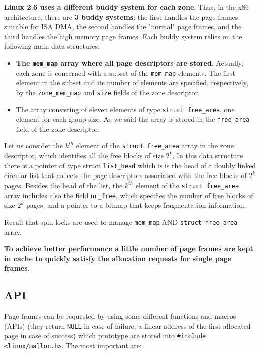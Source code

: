 \documentclass[10pt,a4paper]{article}
\begin{document}
\textbf{Linux 2.6 uses a different buddy system for each zone}. Thus, in the x86 architecture, there are \textbf{3 buddy systems}: the first handles the page frames suitable for ISA DMA, the second handles the "normal" page frames, and the third handles the high memory page frames. Each buddy system relies on the following main data structures:
\begin{itemize}
\item \textbf{The \texttt{mem\_map} array where all page descriptors are stored}. Actually, each zone is concerned with a subset of the \texttt{mem\_map} elements. The first element in the subset and its number of elements are specified, respectively, by the \texttt{zone\_mem\_map} and \texttt{size} fields of the zone descriptor.

\item The array consisting of eleven elements of type \texttt{struct free\_area}, one element for each group size. As we said the array is stored in the \texttt{free\_area} field of the zone descriptor.
\end{itemize}

Let us consider the $k^{th}$ element of the \texttt{struct free\_area} array in the zone descriptor, which identifies all the free blocks of size $2^k$. In this data structure there is a pointer of type struct \texttt{list\_head}  which is is the head of a doubly linked circular list that collects the page descriptors associated with the free blocks of $2^k$ pages. Besides the head of the list, the $k^{th}$ element of the \texttt{struct free\_area} array includes also the field \texttt{nr\_free}, which specifies the number of free blocks of size $2^k$ pages, and a pointer to a bitmap that keeps fragmentation information.  

Recall that spin locks are used to manage \texttt{mem\_map} AND \texttt{struct free\_area} array.

\textbf{To achieve better performance a little number of page frames are kept in cache to quickly satisfy the allocation requests for single page frames}.

\subsection{API}

Page frames can be requested by using some different functions and macros (APIs) (they return \texttt{NULL} in case of failure, a linear address of the first allocated page in case of success) which prototype are stored into \texttt{\#include <linux/malloc.h>}. The most important are:
\end{document}
